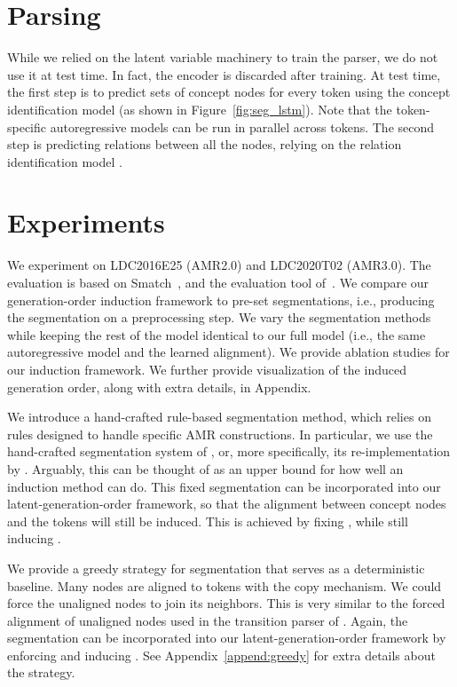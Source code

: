 \documentclass[11pt]{article}
\begin{document}
\section{Parsing}
\label{sec:parsing}

While we relied on the latent variable machinery to train the parser, we do not use it at test time. In fact, the encoder  is discarded after training. At test time, the first step is to predict sets of concept nodes for every token using the concept identification model  (as shown in Figure~\ref{fig:seg_lstm}). Note that the token-specific autoregressive models can be run in parallel across tokens. The second step is predicting relations between all the nodes, relying on the relation identification model . 



\section{Experiments} 

We experiment on LDC2016E25 (AMR2.0) and 
LDC2020T02 (AMR3.0).  \nocite{Cai2013SmatchAE}
The evaluation is  based on Smatch~\cite{Cai2013SmatchAE}, and the evaluation tool of~.  
We compare
our generation-order induction framework to pre-set segmentations, i.e., producing the segmentation on a preprocessing step.  We vary the segmentation methods while keeping the rest of the model identical to our full model (i.e., the same autoregressive model and the learned alignment). We provide ablation studies for our induction framework. We further provide visualization of the induced generation order, along with extra details, in Appendix. 


\vspace{1ex}
  \label{sec:fixed-seg} \quad
We introduce a hand-crafted rule-based segmentation method, which relies on rules designed to handle specific AMR constructions. In particular, we use the hand-crafted segmentation system of  , or, more specifically, its re-implementation by .  
Arguably, this can be thought of as an upper bound for how well an induction method can do.
This fixed segmentation can be  incorporated into our  latent-generation-order framework, so that the alignment  between concept nodes and the tokens will still be induced. This is achieved by fixing , while still inducing .


\vspace{1ex}
  \quad
We provide a greedy strategy for segmentation that serves as a deterministic baseline. Many nodes are aligned to tokens with the copy mechanism. We could force the unaligned nodes to join its neighbors. This is very similar to the forced alignment of unaligned nodes used in the transition parser of . Again, the segmentation can be  incorporated into our  latent-generation-order framework by enforcing  and inducing .
See Appendix~\ref{append:greedy} for extra details about the strategy.
\end{document}
